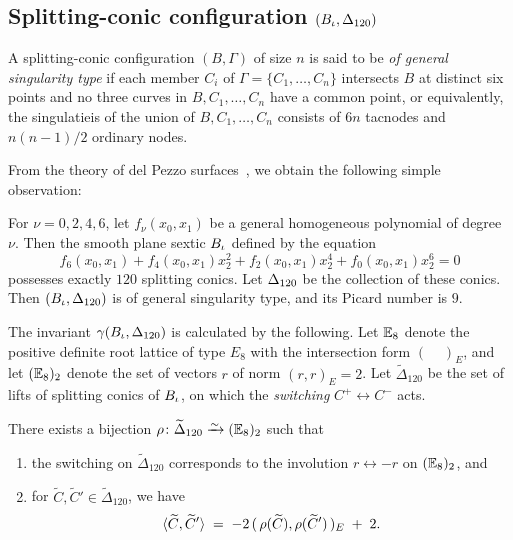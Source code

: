 \documentclass{amsart} %
\begin{document}
\subsection{Splitting-conic configuration $(B_{\iota}, \Delta_{120})$}\label{subsec:A}
%
\begin{definition}
A splitting-conic configuration $(B, \Gamma)$
of size $n$
is said to be \emph{of general singularity type}
if each member $C_i$ of $\Gamma=\{C_1, \ldots, C_n\}$ intersects $B$
at distinct six points and no three curves
in $B, C_1, \ldots, C_n$ have a common point,
or equivalently,
the singulatieis of 
the union of $B, C_1, \ldots, C_n$
consists of $6n$ tacnodes and $n(n-1)/2$ ordinary nodes.
\end{definition}
%
From the theory of del Pezzo surfaces~\cite{ShimadaTurk},
we obtain  the following simple observation:
%
\begin{proposition}\label{prop:120rats}
For $\nu=0,2,4,6$,
let $f_{\nu} (x_0, x_1)$ be a general  
homogeneous polynomial 
of degree $\nu$.
Then the smooth plane sextic $B_{\iota}$ defined by the equation 
%
\begin{equation}\label{eq:iotainvsextic}
f_6(x_0, x_1) +f_4(x_0, x_1) x_2^2 + f_2(x_0, x_1) x_2^4 + f_0(x_0, x_1) x_2^6=0
\end{equation}
%
possesses exactly $120$ splitting conics.
Let $\Delta_{120}$ be the collection  of these conics.
Then $(B_{\iota}, \Delta_{120})$ is of general singularity type,
and its Picard number is $9$.
\end{proposition}
%
The invariant $\gamma(B_{\iota}, \Delta_{120})$ is calculated by the 
following.
Let $\mathord{\mathbb{E}}_8$ denote the positive definite root lattice
of type $E_8$ with the intersection form
$(\phantom{i,i})_{E}$,
and let $(\mathord{\mathbb{E}}_{8})_2$ denote the set of vectors
$r$ of norm $(r, r)_{E}=2$.
Let $\widetilde{\Delta}_{120}$
be the set of lifts of splitting conics of $B_{\iota}$,
on which the \emph{switching}  $C^+ \leftrightarrow C^-$ acts.
%
\begin{proposition}
There exists a bijection $\rho \colon \widetilde{\Delta}_{120} \isom  (\EE_{8})_2$
such that 
%
\begin{enumerate}[label={\rm(\roman*)}]
\item  the switching on
$\widetilde{\Delta}_{120}$
corresponds to the involution  $r \leftrightarrow -r$
on $(\mathord{\mathbb{E}}_{8})_2$,
and
\item 
for
$\widetilde{C}, \widetilde{C}' \in \widetilde{\Delta}_{120}$,
we have
\[
\langle \widetilde{C}, \widetilde{C}' \rangle
\;=\;
-2\,(\,\rho(\widetilde{C}),\rho(\widetilde{C}')\, )_E \;+\; 2.
\]
\end{enumerate}
\end{proposition}
\end{document}
